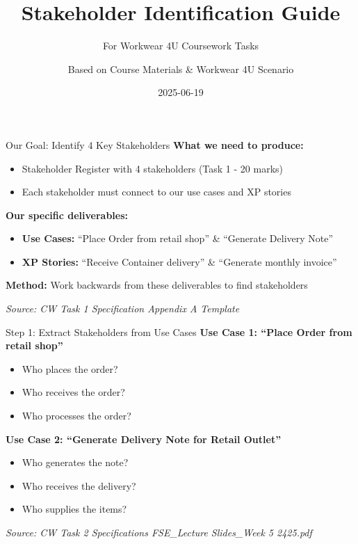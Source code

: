 \documentclass[
  ignorenonframetext,
]{beamer}
\title{Stakeholder Identification Guide}
\subtitle{For Workwear 4U Coursework Tasks}
\author{Based on Course Materials \& Workwear 4U Scenario}
\date{2025-06-19}
\providecommand{\tightlist}{%
  \setlength{\itemsep}{0pt}\setlength{\parskip}{0pt}}
\begin{document}
\frame{\titlepage}

\begin{frame}{Our Goal: Identify 4 Key Stakeholders}
\label{our-goal-identify-4-key-stakeholders}
\textbf{What we need to produce:}

\begin{itemize}
\tightlist
\item
  Stakeholder Register with 4 stakeholders (Task 1 - 20 marks)
\item
  Each stakeholder must connect to our use cases and XP stories
\end{itemize}

\textbf{Our specific deliverables:}

\begin{itemize}
\tightlist
\item
  \textbf{Use Cases:} ``Place Order from retail shop'' \& ``Generate
  Delivery Note''
\item
  \textbf{XP Stories:} ``Receive Container delivery'' \& ``Generate
  monthly invoice''
\end{itemize}

\textbf{Method:} Work backwards from these deliverables to find
stakeholders

\emph{Source: CW Task 1 Specification \textbar{} Appendix A Template}
\end{frame}

\begin{frame}{Step 1: Extract Stakeholders from Use Cases}
\label{step-1-extract-stakeholders-from-use-cases}
\textbf{Use Case 1: ``Place Order from retail shop''}

\begin{itemize}
\tightlist
\item
  Who places the order?
\item
  Who receives the order?
\item
  Who processes the order?
\end{itemize}

\textbf{Use Case 2: ``Generate Delivery Note for Retail Outlet''}

\begin{itemize}
\tightlist
\item
  Who generates the note?
\item
  Who receives the delivery?
\item
  Who supplies the items?
\end{itemize}

\emph{Source: CW Task 2 Specifications \textbar{} FSE\_Lecture
Slides\_Week 5 2425.pdf}
\end{frame}
\end{document}
